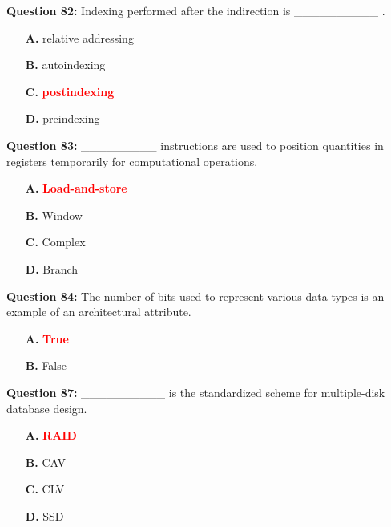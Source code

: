\documentclass[12pt,a4paper]{article}
\begin{document}
\vspace{0.5cm}

\textbf{Question 82:} Indexing performed after the indirection is __________ .

\begin{itemize}
    \item[\textbf{A.}] relative addressing
    \item[\textbf{B.}] autoindexing
    \item[\textbf{C.}] \textcolor{red}{\textbf{postindexing}}
    \item[\textbf{D.}] preindexing
\end{itemize}

\vspace{0.5cm}

\textbf{Question 83:} _________ instructions are used to position quantities in registers temporarily for computational operations.

\begin{itemize}
    \item[\textbf{A.}] \textcolor{red}{\textbf{Load-and-store}}
    \item[\textbf{B.}] Window
    \item[\textbf{C.}] Complex
    \item[\textbf{D.}] Branch
\end{itemize}

\vspace{0.5cm}

\textbf{Question 84:} The number of bits used to represent various data types is an example of an architectural attribute.

\begin{itemize}
    \item[\textbf{A.}] \textcolor{red}{\textbf{True}}
    \item[\textbf{B.}] False
\end{itemize}

\vspace{0.5cm}

\textbf{Question 87:} __________ is the standardized scheme for multiple-disk database design.

\begin{itemize}
    \item[\textbf{A.}] \textcolor{red}{\textbf{RAID}}
    \item[\textbf{B.}] CAV
    \item[\textbf{C.}] CLV
    \item[\textbf{D.}] SSD
\end{itemize}
\end{document}
